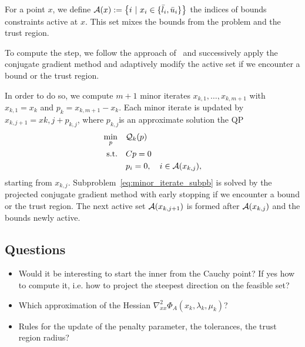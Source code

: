 \documentclass[10pt]{article}
\begin{document}
	For a point $x$, we define ${\mathcal{A}}(x):=\left\{i\ \vert \ x_i \in \{\bar{l}_i,\bar{u}_i\}\right\}$ the indices of bounds constraints active at $x$. This set mixes the bounds from the problem and the trust region.
	
	To compute the step, we follow the approach of~\citet{linmore:1999a} and successively apply the conjugate gradient method and adaptively modify the active set if we encounter a bound or the trust region.
	
	In order to do so, we compute $m+1$ minor iterates $x_{k,1}, \ldots, x_{k,m+1}$ with $x_{k,1}=x_k$ and $p_k=x_{k,m+1}-x_k$. Each minor iterate is updated by $x_{k,j+1}=x{k,j}+p_{k,j}$, where $p_{k,j}$is an approximate solution the QP
	\begin{equation}\label{eq:minor_iterate_subpb}
		\begin{aligned}
			\min_{p} \quad& {\mathcal{Q}}_k(p)  \\
			\text{s.t.}  \quad &  Cp=0\\
			& p_i=0,\quad i\in {\mathcal{A}}(x_{k,j}),
		\end{aligned}	
	\end{equation}
	starting from $x_{k,j}$. Subproblem~\eqref{eq:minor_iterate_subpb} is solved by the projected conjugate gradient method with early stopping if we encounter a bound or the trust region. The next active set ${\mathcal{A}}(x_{k,j+1})$ is formed after ${\mathcal{A}}(x_{k,j})$ and the bounds newly active.  

	\subsection{Questions}
	\begin{itemize}
		\item Would it be interesting to start the inner from the Cauchy point? If yes how to compute it, i.e. how to project the steepest direction on the feasible set?
		\item Which approximation of the Hessian $\nabla^2_{xx} \Phi_A(x_k,\lambda_k,\mu_k)$?
		\item Rules for the update of the penalty parameter, the tolerances, the trust region radius?
	\end{itemize}
	\clearpage
	
	
	
	
\end{document}
